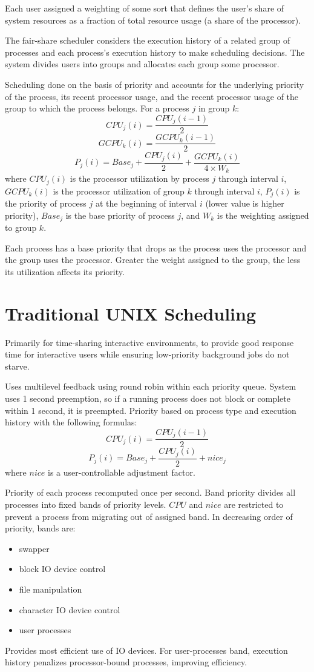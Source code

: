 \documentclass[11pt]{article}
\begin{document}
Each user assigned a weighting of some sort that defines the user's share of system
resources as a fraction of total resource usage (a share of the processor).

The fair-share scheduler considers the execution history of a related group of processes
and each process's execution history to make scheduling decisions.
The system divides users into groups and allocates each group some processor.

Scheduling done on the basis of priority and accounts for the underlying priority of the
process, its recent processor usage, and the recent processor usage of the group to which
the process belongs.
For a process \(j\) in group \(k\):
$$
CPU_{j}(i) = \frac{CPU_{j}(i-1)}{2}
$$
$$
GCPU_{k}(i) = \frac{GCPU_{k}(i-1)}{2}
$$
$$
P_{j}(i) = Base_{j} + \frac{CPU_{j}(i)}{2} + \frac{GCPU_{k}(i)}{4 \times W_{k}}
$$
where \(CPU_{j}(i)\) is the processor utilization by process \(j\) through interval \(i\),
\(GCPU_{k}(i)\) is the processor utilization of group \(k\) through interval \(i\),
\(P_{j}(i)\) is the priority of process \(j\) at the beginning of interval \(i\) (lower value
is higher priority),
\(Base_{j}\) is the base priority of process \(j\),
and \(W_{k}\) is the weighting assigned to group \(k\).

Each process has a base priority that drops as the process uses the processor and the group
uses the processor.
Greater the weight assigned to the group, the less its utilization affects its priority.
\section{Traditional UNIX Scheduling}
\label{sec:org114db5f}
Primarily for time-sharing interactive environments, to provide good response time for
interactive users while ensuring low-priority background jobs do not starve.

Uses multilevel feedback using round robin within each priority queue.
System uses 1 second preemption, so if a running process does not block or complete within
1 second, it is preempted.
Priority based on process type and execution history with the following formulas:
$$
CPU_{j}(i) = \frac{CPU_{j}(i-1)}{2}
$$
$$
P_{j}(i) = Base_{j} + \frac{CPU_{j}(i)}{2} + nice_{j}
$$
where \(nice\) is a user-controllable adjustment factor.

Priority of each process recomputed once per second.
Band priority divides all processes into fixed bands of priority levels.
\(CPU\) and \(nice\) are restricted to prevent a process from migrating out of assigned band.
In decreasing order of priority, bands are:
\begin{itemize}
\item swapper
\item block IO device control
\item file manipulation
\item character IO device control
\item user processes
\end{itemize}
Provides most efficient use of IO devices.
For user-processes band, execution history penalizes processor-bound processes, improving
efficiency.
\end{document}
